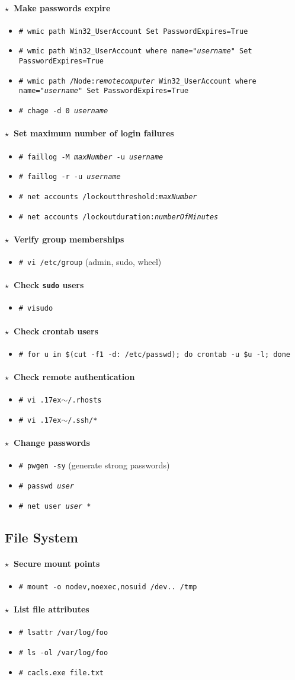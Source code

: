 \documentclass[10pt,landscape]{article}
\newcommand{\os}[1]{\texttt{\footnotesize{#1}}}
\newcommand{\unix}{\os{U}}
\newcommand{\bsd}{\os{B}}
\newcommand{\linux}{\os{L}}
\newcommand{\windows}{\os{W}}
\newenvironment{action}[1]
  {\paragraph{$\star$~#1}\begin{itemize}[leftmargin=1cm]}
  {\end{itemize}}
\newcommand{\cmd}[2]{\item[#1] {\small\tt\# #2}}
\newcommand{\comment}[1]{\textrm{\small(#1)}}
\newcommand{\home}{\raise.17ex\hbox{$\scriptstyle\sim$}}
\begin{document}
\begin{multicols*}{3}
\begin{action}{Make passwords expire}
\cmd{\windows}{wmic path Win32\_UserAccount Set PasswordExpires=True}
\cmd{\windows}{wmic path Win32\_UserAccount where name="\emph{username}" Set PasswordExpires=True}
\cmd{\windows}{wmic path /Node:\emph{remotecomputer} Win32\_UserAccount where name="\emph{username}" Set PasswordExpires=True}
\cmd{\linux}{chage -d 0 \emph{username}}
\end{action}

\begin{action}{Set maximum number of login failures}
\cmd{\linux}{faillog -M \emph{maxNumber} -u \emph{username}}
\cmd{\linux}{faillog -r -u \emph{username}}
\cmd{\windows}{net accounts /lockoutthreshold:\emph{maxNumber}}
\cmd{\windows}{net accounts /lockoutduration:\emph{numberOfMinutes}}
\end{action}

\begin{action}{Verify group memberships}
\cmd{\unix}{vi /etc/group} \comment{admin, sudo, wheel}
\end{action}

\begin{action}{Check \texttt{sudo} users}
\cmd{\unix}{visudo}
\end{action}

\begin{action}{Check crontab users}
\cmd{\unix}{for u in \$(cut -f1 -d: /etc/passwd); do crontab -u \$u -l; done}
\end{action}

\begin{action}{Check remote authentication}
\cmd{\unix}{vi \home/.rhosts}
\cmd{\unix}{vi \home/.ssh/*}
\end{action}

\begin{action}{Change passwords}
\cmd{\unix}{pwgen -sy} \comment{generate strong passwords}
\cmd{\unix}{passwd \emph{user}}
\cmd{\windows}{net user \emph{user} *}
\end{action}

\subsection*{File System}

\begin{action}{Secure mount points}
\cmd{\unix}{mount -o nodev,noexec,nosuid /dev.. /tmp}
\end{action}

\begin{action}{List file attributes}
\cmd{\linux}{lsattr /var/log/foo}
\cmd{\bsd}{ls -ol /var/log/foo}
\cmd{\windows}{cacls.exe file.txt}
\end{action}


\end{multicols*}
\end{document}
